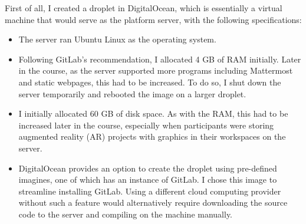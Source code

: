 \documentclass[12pt,twoside]{mitthesis}
\newcommand{\draft}[1]{{\color{blue} #1}}
\begin{document}
\draft{First of all, I created a droplet in DigitalOcean, which is essentially a virtual machine that would serve as the platform server, with the following specifications:
\begin{itemize}
	\item The server ran Ubuntu Linux as the operating system.
	\item Following GitLab's recommendation, I allocated 4 GB of RAM initially. Later in the course, as the server supported more programs including Mattermost and static webpages, this had to be increased. To do so, I shut down the server temporarily and rebooted the image on a larger droplet.
	\item I initially allocated 60 GB of disk space. As with the RAM, this had to be increased later in the course, especially when participants were storing augmented reality (AR) projects with graphics in their workspaces on the server.
	\item DigitalOcean provides an option to create the droplet using pre-defined imagines, one of which has an instance of GitLab. I chose this image to streamline installing GitLab. Using a different cloud computing provider without such a feature would alternatively require downloading the source code to the server and compiling on the machine manually.
\end{itemize}

}
\end{document}
